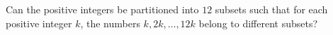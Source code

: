 Can the positive integers be partitioned into $12$ subsets such that for each positive integer $k$,  the numbers $k, 2k,\ldots,12k$ belong to different subsets?
